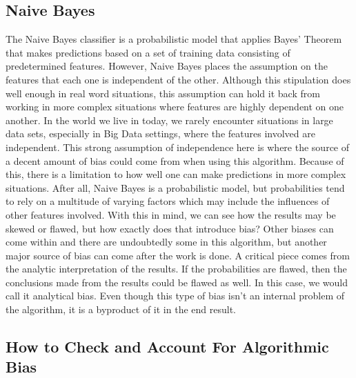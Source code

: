 \documentclass[sigconf]{acmart}
\begin{document}
\subsection{Naive Bayes}

The Naive Bayes classifier is a probabilistic model that applies Bayes' Theorem that makes predictions based on a set of training data consisting of predetermined features. However, Naive Bayes places the assumption on the features that each one is independent of the other. Although this stipulation does well enough in real word situations, this assumption can hold it back from working in more complex situations where features are highly dependent on one another. In the world we live in today, we rarely encounter situations in large data sets, especially in Big Data settings, where the features involved are independent. This strong assumption of independence here is where the source of a decent amount of bias could come from when using this algorithm. Because of this, there is a limitation to how well one can make predictions in more complex situations. After all, Naive Bayes is a probabilistic model, but probabilities tend to rely on a multitude of varying factors which may include the influences of other features involved.  With this in mind, we can see how the results may be skewed or flawed, but how exactly does that introduce bias? Other biases can come within and there are undoubtedly some in this algorithm, but another major source of bias can come after the work is done. A critical piece comes from the analytic interpretation of the results. If the probabilities are flawed, then the conclusions made from the results could be flawed as well. In this case, we would call it analytical bias. Even though this type of bias isn't an internal problem of the algorithm, it is a byproduct of it in the end result.

\subsection{How to Check and Account For Algorithmic Bias}
\end{document}

